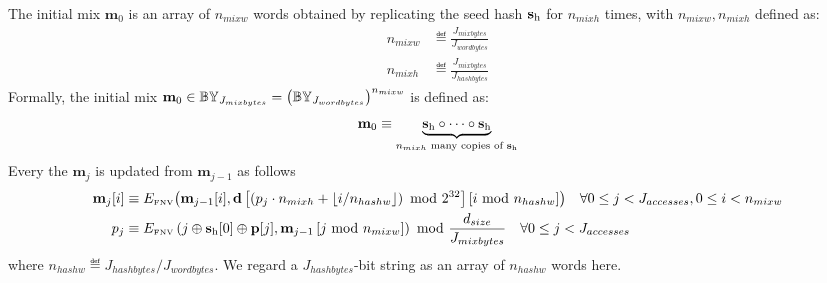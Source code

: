 The initial mix $\mathbf{m}_0$ is an array of $n_{mixw}$ words 
obtained by replicating the seed hash $\mathbf{s}_{\mathrm{h}}$ for $n_{mixh}$ times, 
with $n_{mixw},n_{mixh}$ defined as:
\begin{align}
	n_{mixw}& \eqdef  \frac{J_{mixbytes}}{J_{wordbytes}}\\
	n_{mixh}& \eqdef  \frac{J_{mixbytes}}{J_{hashbytes}}
\end{align}
Formally, the initial mix 
$\mathbf{m}_0 \in \mathbb{BY}_{J_{mixbytes}}
=\left(\mathbb{BY}_{J_{wordbytes}}\right)^{n_{mixw}}$ is defined as:
\begin{equation}
	\mathbf{m}_0 \equiv \underbrace{\mathbf{s}_{\mathrm{h}} \circ \cdots \circ \mathbf{s}_{\mathrm{h}}}_{\text{$n_{mixh}$ many copies of $\mathbf{s}_{\mathrm{h}}$}}
\end{equation}
%
Every the $\mathbf{m}_j$ is updated from $\mathbf{m}_{j-1}$ as follows
\begin{align}
 \mathbf{m}_j[i] &\equiv 
	E_\text{\tiny FNV}\big(
		\mathbf{m}_{j-1}[i], 
		\mathbf{d}\left[
			\left(p_j\cdot n_{mixh} +\lfloor i/n_{hashw}\rfloor \right) \mbox{ mod } 2^{32}
		\right][i\mbox{ mod } n_{hashw}]
	\big) \quad \forall 0\le j<J_{accesses},0\le i< n_{mixw}\\ 
 {p}_j &\equiv 
	E_\text{\tiny FNV}\left(j \oplus \mathbf{s}_{\mathrm{h}}[0] \oplus \mathbf{p}[j], \mathbf{m}_{j-1}\left[j \mbox{ mod } n_{mixw}\right]\right) \mbox{ mod } \frac{d_{size}}{J_{mixbytes}}\quad \forall 0\le j<J_{accesses}
\end{align}
where $n_{hashw}\eqdef J_{hashbytes}/J_{wordbytes}$. We regard a $J_{hashbytes}$-bit string as an array of $n_{hashw}$ words here. 

